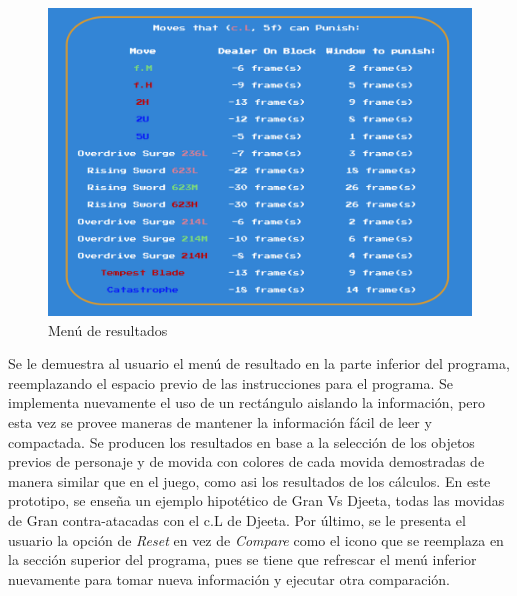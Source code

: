 \begin{center}
    \begin{figure}
        \centering
        \includegraphics[height=0.4\textheight]{figures/Results_menu-object.png}
        \caption{Menú de resultados}
        \label{fig: rslt prt}
    \end{figure}  
\end{center}

\newpage
    Se le demuestra al usuario el menú de resultado en la parte inferior del programa, reemplazando el espacio previo de las instrucciones para el programa. Se implementa nuevamente el uso de un rectángulo aislando la información, pero esta vez se provee maneras de mantener la información fácil de leer y compactada. Se producen los resultados en base a la selección de los objetos previos de personaje y de movida con colores de cada movida demostradas de manera similar que en el juego, como asi los resultados de los cálculos. En este  prototipo, se enseña un ejemplo hipotético de Gran Vs Djeeta, todas las movidas de Gran contra-atacadas con el c.L de Djeeta. Por último, se le presenta el usuario la opción de \textit{Reset} en vez de \textit{Compare} como el icono que se reemplaza en la sección superior del programa, pues se tiene que refrescar el menú inferior nuevamente para tomar nueva información y ejecutar otra comparación.

